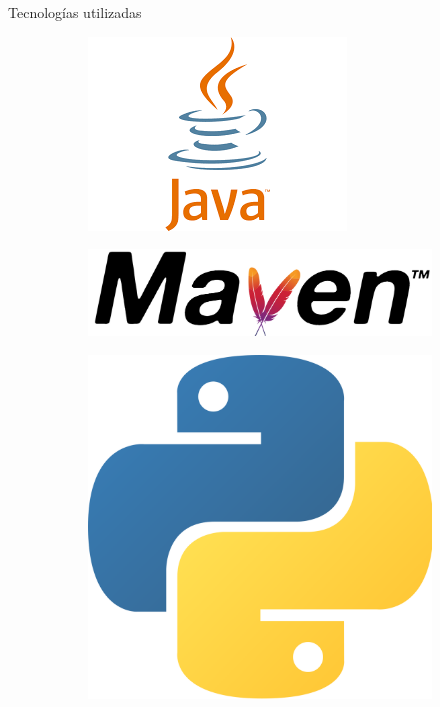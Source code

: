 \documentclass[11pt]{beamer}    %
\begin{document}
    \begin{frame}{Tecnologías utilizadas}
        \begin{figure}
            \centering
            \begin{subfigure}[t]{0.33\textwidth}
                \centering
                \includegraphics[scale=1]{img/presentation/java}
            \end{subfigure}%
            \begin{subfigure}[t]{0.33\textwidth}
                \centering
                \includegraphics[scale=0.05]{img/presentation/maven}
            \end{subfigure}%
            \begin{subfigure}[t]{0.33\textwidth}
                \centering
                \includegraphics[scale=0.03]{img/presentation/python}

\end{subfigure}
\end{figure}
\end{frame}
\end{document}
